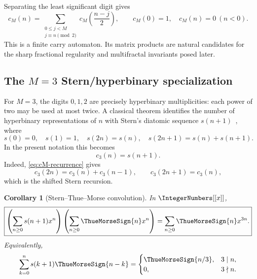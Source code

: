 \documentclass[11pt,oneside]{article}
\newtheorem{corollary}[theorem]{Corollary}
\theoremstyle{definition}
\theoremstyle{remark}
\begin{document}
Separating the least significant digit gives
\begin{equation}
 c_M(n)=
 \sum_{\substack{0\le j<M\\j\equiv n\pmod2}}
 c_M\!\left(\frac{n-j}{2}\right),
 \qquad
 c_M(0)=1,
 \quad c_M(n)=0\ (n<0).
 \label{eq:cM-recurrence}
\end{equation}
This is a finite carry automaton.  Its matrix products are natural candidates for the sharp
fractional regularity and multifractal invariants posed later.

\subsection{The $M=3$ Stern/hyperbinary specialization}

For $M=3$, the digits $0,1,2$ are precisely hyperbinary multiplicities: each power of two
may be used at most twice.  A classical theorem identifies the number of hyperbinary
representations of $n$ with Stern's diatomic sequence $s(n+1)$~\cite{DilcherEricksen2015}, where
\begin{equation}
 s(0)=0,
 \quad s(1)=1,
 \quad s(2n)=s(n),
 \quad s(2n+1)=s(n)+s(n+1).
 \label{eq:Stern}
\end{equation}
In the present notation this becomes
\begin{equation}
 c_3(n)=s(n+1).
 \label{eq:c3-Stern}
\end{equation}
Indeed, \eqref{eq:cM-recurrence} gives
\begin{equation}
 c_3(2n)=c_3(n)+c_3(n-1),
 \qquad
 c_3(2n+1)=c_3(n),
 \label{eq:c3-recurrence}
\end{equation}
which is the shifted Stern recursion.

\begin{corollary}[Stern--Thue--Morse convolution]
\label{cor:Stern-TM}
In $\IntegerNumbers[[x]]$,
\begin{equation}
 \boxed{
 \left(\sum_{n\ge0}s(n+1)x^n\right)
 \left(\sum_{n\ge0}\ThueMorseSign{n}x^n\right)
 =\sum_{n\ge0}\ThueMorseSign{n}x^{3n}.}
 \label{eq:Stern-TM}
\end{equation}
Equivalently,
\begin{equation}
 \sum_{k=0}^{n}s(k+1)\ThueMorseSign{n-k}
 =\begin{cases}
 \ThueMorseSign{n/3},&3\mid n,\\0,&3\nmid n.
 \end{cases}
 \label{eq:Stern-TM-coeff}
\end{equation}
\end{corollary}
\end{document}
